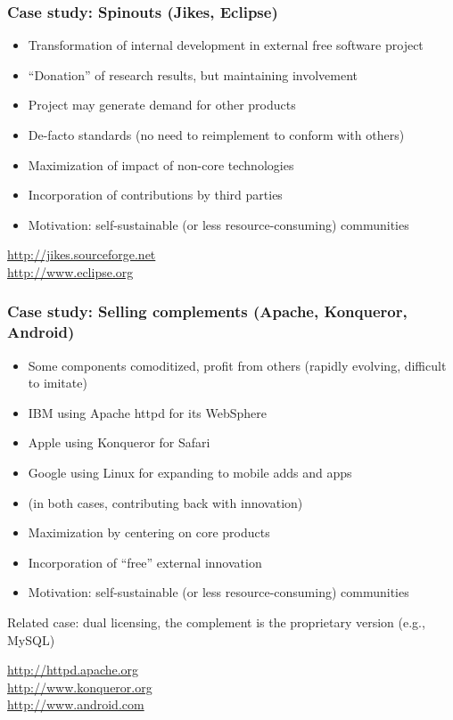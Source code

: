 \begin{frame}
\frametitle{Case study: Spinouts (Jikes, Eclipse)}

\begin{itemize}
\item Transformation of internal development in external free software project
\item ``Donation'' of research results, but maintaining involvement
\item Project may generate demand for other products
\item De-facto standards (no need to reimplement to conform with others)
\item Maximization of impact of non-core technologies
\item Incorporation of contributions by third parties
\item Motivation: self-sustainable (or less resource-consuming) communities
\end{itemize}

\begin{flushright}
\url{http://jikes.sourceforge.net} \\
\url{http://www.eclipse.org}
\end{flushright}
\end{frame}


\begin{frame}
\frametitle{Case study: Selling complements (Apache, Konqueror, Android)}

\begin{itemize}
\item Some components comoditized, profit from others (rapidly evolving, difficult to imitate)
\item IBM using Apache httpd for its WebSphere
\item Apple using Konqueror for Safari
\item Google using Linux for expanding to mobile adds and apps
\item (in both cases, contributing back with innovation)
\item Maximization by centering on core products
\item Incorporation of ``free'' external innovation
\item Motivation: self-sustainable (or less resource-consuming) communities
\end{itemize}

Related case: dual licensing, the complement is the proprietary version (e.g., MySQL)

\begin{flushright}
\url{http://httpd.apache.org} \\
\url{http://www.konqueror.org} \\
\url{http://www.android.com}
\end{flushright}

\end{frame}


